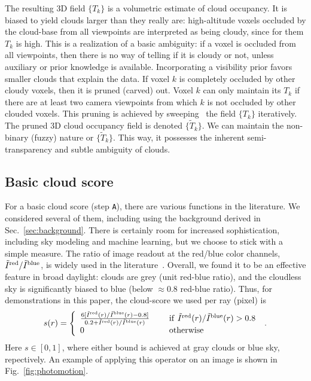 \documentclass[runningheads]{llncs}
\begin{document}
The resulting 3D field $\{T_k\}$ is a volumetric estimate of cloud occupancy. It is biased to yield clouds larger than they really are: high-altitude voxels occluded by the cloud-base from all viewpoints are interpreted as being cloudy, since for them $T_k$ is high. This is a realization of a basic ambiguity: if a voxel is occluded from all viewpoints, then there is no way of telling if it is cloudy or not, unless auxiliary or prior knowledge is available. Incorporating a visibility prior favors smaller clouds that explain the data. If voxel $k$ is completely occluded by other cloudy voxels, then it is pruned (carved) out. Voxel $k$ can only maintain its $T_k$ if there are at least two camera viewpoints from which $k$ is not occluded by other clouded voxels. This pruning is achieved by sweeping~\cite{Kutulakos2000} the field $\{T_k\}$ iteratively. The pruned 3D cloud occupancy field is denoted $\{\tilde T_k\}$. We can maintain the non-binary (fuzzy) nature or $\{\tilde T_k\}$. This way, it possesses the inherent semi-transparency and subtle ambiguity of clouds.

\subsection*{Basic cloud score}
\label{sec:cloudscore}


For a basic cloud score (step {\tt A}), there are various functions in the literature. We considered several of them, including using the background derived in Sec.~\ref{sec:background}. There is certainly room for increased sophistication, including sky modeling and machine learning, but we choose to stick with a simple measure. The ratio of image readout at the red/blue color channels, $\tilde I^{\rm red}/\tilde I^{\rm blue}$, is widely used in the literature~\cite{Yamashita2004,Seiz2002}. Overall, we found it to be an effective feature in broad daylight: clouds are grey (unit red-blue ratio), and the cloudless sky is significantly biased to blue
(below $\approx 0.8$ red-blue ratio). Thus, for demonstrations in this paper,
the cloud-score we used per ray (pixel) is
\begin{equation}
 s(r)=\left\{
      \begin{array}{ll}
      \frac{6 [\tilde I^{\rm red}(r)/\tilde I^{\rm blue}(r)-0.8]}
           {0.2+\tilde I^{\rm red}(r)/\tilde I^{\rm blue}(r)}
      & ~~~~{\rm if}~ \tilde I^{\rm red}(r)/\tilde I^{\rm blue}(r)>0.8 \\
      0
      & ~~~~{\rm otherwise}
      \end{array}
      \right.
  \;.
 \label{eq:sr}
\end{equation}
Here $s\in[0,1]$, where either bound is achieved at gray clouds or blue sky, repectively. An example of applying this operator on an image is shown in Fig.~\ref{fig:photomotion}.
\end{document}
